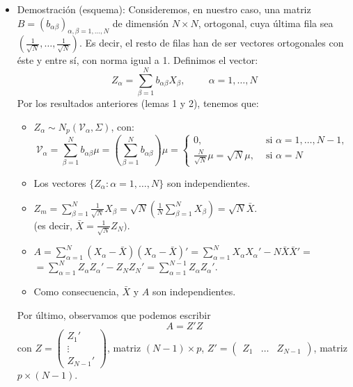 \documentclass[11pt,a4paper]{article}
\begin{document}
\begin{itemize}
\item Demostración (esquema): Consideremos, en nuestro caso, una matriz $B = (b_{\alpha\beta})_{\alpha, \beta = 1, \dots, N}$ de dimensión $N \times N$, ortogonal, cuya última fila sea $(\frac{1}{\sqrt{N}}, \dots, \frac{1}{\sqrt{N}})$. Es decir, el resto de filas han de ser vectores ortogonales con éste y entre sí, con norma igual a 1. Definimos el vector:
$$Z_{\alpha} = \sum_{\beta=1}^{N} b_{\alpha\beta} X_{\beta}, \hspace{1cm} \alpha = 1, \dots, N$$
Por los resultados anteriores (lemas 1 y 2), tenemos que:
\begin{itemize}
\item $Z_{\alpha} \sim N_{p}(\mathcal{V}_{\alpha}, \Sigma)$, con:
$$\mathcal{V}_{\alpha} = \sum_{\beta=1}^{N}b_{\alpha\beta}\mu = (\sum_{\beta=1}^{N} b_{\alpha\beta}) \mu = \begin{cases}
0, & \text{ si } \alpha = 1, \dots, N-1, \\
\frac{N}{\sqrt{N}}\mu = \sqrt{N}\mu, & \text{ si } \alpha = N
\end{cases}$$

\item Los vectores $\{Z_{\alpha}: \alpha = 1, \dots, N\}$ son independientes.

\item $Z_{m} = \sum_{\beta=1}^{N} \frac{1}{\sqrt{N}}X_{\beta} = \sqrt{N}(\frac{1}{N} \sum_{\beta=1}^{N} X_{\beta}) = \sqrt{N}\bar{X}$. \\
(es decir, $\bar{X} = \frac{1}{\sqrt{N}}Z_{N})$.

\item $A = \sum_{\alpha=1}^{N}(X_{\alpha} - \bar{X})(X_{\alpha} - \bar{X})' = \sum_{\alpha=1}^{N} X_{\alpha}X_{\alpha}' - N\bar{X}\bar{X}' =$ \\ $= \sum_{\alpha=1}^{N} Z_{\alpha}Z_{\alpha}' - Z_{N}Z_{N}' = \sum_{\alpha=1}^{N-1}Z_{\alpha}Z_{\alpha}'$.

\item Como consecuencia, $\bar{X}$ y $A$ son independientes.
\end{itemize}
Por último, observamos que podemos escribir
$$A = Z'Z$$
con $Z = \begin{pmatrix} Z_{1}' \\ \vdots \\ Z_{N-1}' \end{pmatrix}$, matriz $(N-1) \times p$, $Z' = \begin{pmatrix} Z_{1} & \dots & Z_{N-1} \end{pmatrix}$, matriz $p \times (N-1)$.


\end{itemize}
\end{document}
